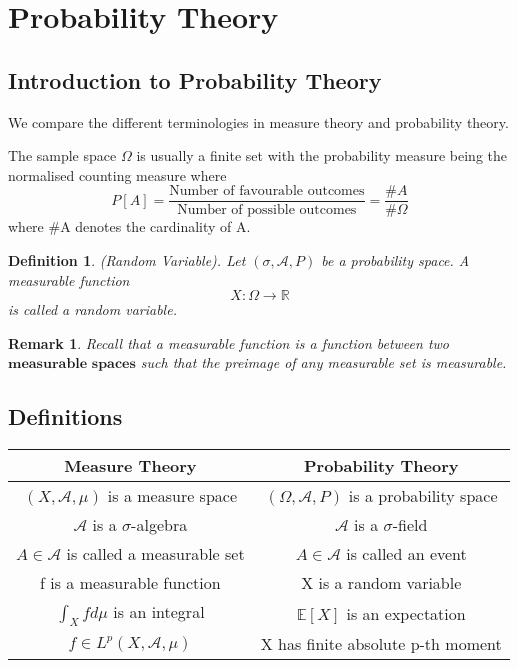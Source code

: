 \documentclass[twoside]{article}
\newtheorem{remark}[theorem]{Remark}
\newtheorem{definition}[theorem]{Definition}
\begin{document}
\section{Probability Theory}
\subsection{Introduction to Probability Theory}

We compare the different terminologies in measure theory and probability theory.

The sample space $\Omega$ is usually a finite set with the probability measure being the normalised counting measure where 
$$
P[A] = \frac{\text{Number of favourable outcomes}}{\text{Number of possible outcomes}} = \frac{\#A}{\#\Omega}
$$
where \#A denotes the cardinality of A.

\begin{definition}(Random Variable). Let $(\sigma, \mathcal{A}, P)$ be a probability space. A measurable function
$$
X: \Omega \rightarrow \mathbb{R}
$$
is called a random variable.
\end{definition}

\begin{remark} Recall that a measurable function is a function between two $\textbf{measurable spaces}$ such that the preimage of any measurable set is measurable.
\end{remark}

\subsection{Definitions}
\begin{center}
\bgroup
\def\arraystretch{1.5}%
\begin{tabular}{ |c|c| } 
 \hline
 Measure Theory & Probability Theory\\ 
 \hline
 $(X, \mathcal{A}, \mu)$ is a measure space & $(\Omega, \mathcal{A}, P)$ is a probability space\\ 
 \hline
 $\mathcal{A}$ is a $\sigma$-algebra & $\mathcal{A}$ is a $\sigma$-field\\ 
 \hline
 $A \in \mathcal{A}$ is called a measurable set & $A \in \mathcal{A}$ is called an event \\
 \hline
 f is a measurable function & X is a random variable\\
 \hline
 $\int_Xfd\mu$ is an integral & $\mathbb{E}[X]$ is an expectation\\
 \hline
 $f \in L^p(X,\mathcal{A},\mu)$ & X has finite absolute p-th moment\\
 \hline
\end{tabular}
\egroup
\end{center}
\end{document}
